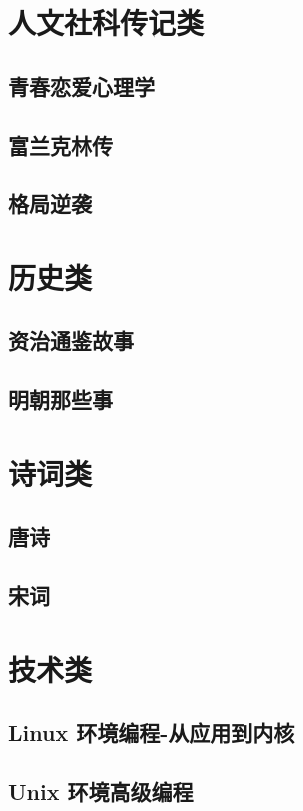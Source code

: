 \documentclass[UTF8,a4paper,12pt]{ctexbook}
\begin{document}
\chapter{人文社科传记类}
	\section{青春恋爱心理学}		
	
	\section{富兰克林传}

	\section{格局逆袭}
	
	
\chapter{历史类}
	\section{资治通鉴故事}
	
	\section{明朝那些事}

\chapter{诗词类}
	\section{唐诗}

	\section{宋词}


\chapter{技术类} 
	\section{Linux 环境编程-从应用到内核}
	
	\section{Unix 环境高级编程}
\end{document}

